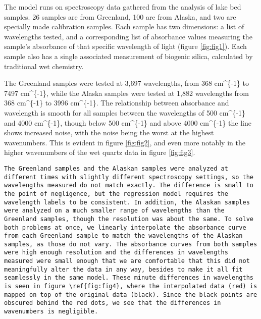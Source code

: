 \documentclass[water,article,submit,moreauthors,pdftex]{mdpi}
\begin{document}
The model runs on spectroscopy data gathered from the analysis of lake
bed samples. 26 samples are from Greenland, 100 are from Alaska, and two
are specially made calibration samples. Each sample has two dimensions:
a list of wavelengths tested, and a corresponding list of absorbance
values measuring the sample's absorbance of that specific wavelength of
light (figure \ref{fig:fig1}). Each sample also has a single associated
measurement of biogenic silica, calculated by traditional wet chemistry.

The Greenland samples were tested at 3,697 wavelengths, from 368
cm\^{}\{-1\} to 7497 cm\^{}\{-1\}, while the Alaska samples were tested
at 1,882 wavelengths from 368 cm\^{}\{-1\} to 3996 cm\^{}\{-1\}. The
relationship between absorbance and wavelength is smooth for all samples
between the wavelengths of 500 cm\^{}\{-1\} and 4000 cm\^{}\{-1\},
though below 500 cm\^{}\{-1\} and above 4000 cm\^{}\{-1\} the line shows
increased noise, with the noise being the worst at the highest
wavenumbers. This is evident in figure \ref{fig:fig2}, and even more
notably in the higher wavenumbers of the wet quartz data in figure
\ref{fig:fig3}.

\begin{verbatim}
The Greenland samples and the Alaskan samples were analyzed at different times with slightly different spectroscopy settings, so the wavelengths measured do not match exactly. The difference is small to the point of negligence, but the regression model requires the wavelength labels to be consistent. In addition, the Alaskan samples were analyzed on a much smaller range of wavelengths than the Greenland samples, though the resolution was about the same. To solve both problems at once, we linearly interpolate the absorbance curve from each Greenland sample to match the wavelengths of the Alaskan samples, as those do not vary. The absorbance curves from both samples were high enough resolution and the differences in wavelengths measured were small enough that we are comfortable that this did not meaningfully alter the data in any way, besides to make it all fit seamlessly in the same model. These minute differences in wavelengths is seen in figure \ref{fig:fig4}, where the interpolated data (red) is mapped on top of the original data (black). Since the black points are obscured behind the red dots, we see that the differences in wavenumbers is negligible. 
\end{verbatim}
\end{document}
